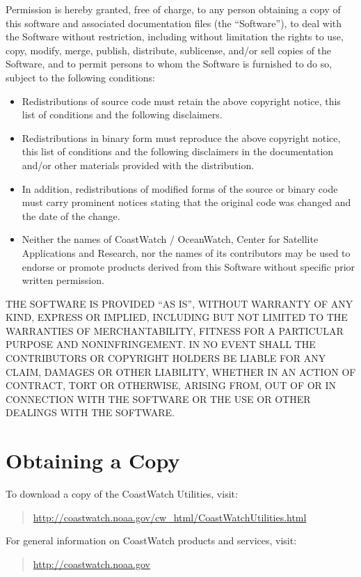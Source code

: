 Permission is hereby granted, free of charge, to any person obtaining
a copy of this software and associated documentation files (the ``Software''),
to deal with the Software without restriction, including without limitation
the rights to use, copy, modify, merge, publish, distribute, sublicense,
and/or sell copies of the Software, and to permit persons to whom the
Software is furnished to do so, subject to the following conditions:
\begin{itemize}

  \item Redistributions of source code must retain the above copyright notice,
  this list of conditions and the following disclaimers.

  \item Redistributions in binary form must reproduce the above copyright notice,
  this list of conditions and the following disclaimers in the documentation
  and/or other materials provided with the distribution.

  \item In addition, redistributions of modified forms of the source or binary
  code must carry prominent notices stating that the original code was
  changed and the date of the change.

  \item Neither the names of CoastWatch / OceanWatch, Center for Satellite
  Applications and Research, nor the names of its contributors may be used
  to endorse or promote products derived from this Software without specific
  prior written permission.

\end{itemize}
THE SOFTWARE IS PROVIDED ``AS IS'', WITHOUT WARRANTY OF ANY KIND, EXPRESS OR
IMPLIED, INCLUDING BUT NOT LIMITED TO THE WARRANTIES OF MERCHANTABILITY,
FITNESS FOR A PARTICULAR PURPOSE AND NONINFRINGEMENT. IN NO EVENT SHALL
THE CONTRIBUTORS OR COPYRIGHT HOLDERS BE LIABLE FOR ANY CLAIM, DAMAGES OR
OTHER LIABILITY, WHETHER IN AN ACTION OF CONTRACT, TORT OR OTHERWISE,
ARISING FROM, OUT OF OR IN CONNECTION WITH THE SOFTWARE OR THE USE OR OTHER
DEALINGS WITH THE SOFTWARE.

\section*{Obtaining a Copy}

To download a copy of the CoastWatch Utilities, visit:
\begin{quote}
  \url{http://coastwatch.noaa.gov/cw\_html/CoastWatchUtilities.html}
\end{quote}
For general information on CoastWatch products and services, visit:
\begin{quote}
  \url{http://coastwatch.noaa.gov}
\end{quote}

